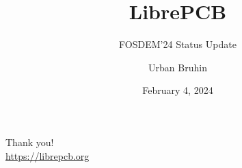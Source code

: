 \documentclass[aspectratio=169,t,notes]{beamer}
\title{LibrePCB}
\subtitle{FOSDEM'24 Status Update}
\date{February 4, 2024} %
\author{Urban Bruhin}
\institute{}
\begin{document}

\maketitle





%
%





%
%
%
%

%
%
%

%
%
%

%

%
%

%
%




%
%





{
\begin{frame}[standout]
	\begin{centering}
	  {\Huge Thank you!}\\
	  {\normalsize \url{https://librepcb.org}}\\
	\end{centering}
\end{frame}
}
\end{document}
